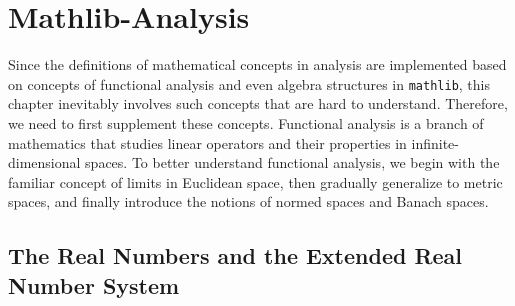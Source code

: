 \documentclass[a4paper]{article}
\begin{document}


\setcounter{section}{3}
\section{Mathlib-Analysis}

Since the definitions of mathematical concepts in analysis are implemented based on concepts of functional analysis and even algebra structures in \texttt{mathlib}, this chapter inevitably involves such concepts that are hard to understand. Therefore, we need to first supplement these concepts. Functional analysis is a branch of mathematics that studies linear operators and their properties in infinite-dimensional spaces. To better understand functional analysis, we begin with the familiar concept of limits in Euclidean space, then gradually generalize to metric spaces, and finally introduce the notions of normed spaces and Banach spaces.


\subsection{The Real Numbers and the Extended Real Number System}
\end{document}
